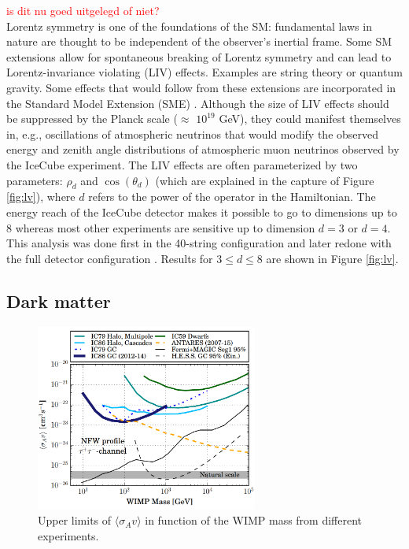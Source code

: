 \textcolor{red}{is dit  nu goed uitgelegd of niet?\\}
Lorentz symmetry is one of the foundations of the SM: fundamental laws in nature are thought to be independent of the observer's inertial frame. Some SM extensions allow for spontaneous breaking of Lorentz symmetry and can lead to Lorentz-invariance violating (LIV) effects. Examples are string theory or quantum gravity. Some effects that would follow from these extensions are incorporated in the Standard Model Extension (SME) \cite{Colladay:1998fq}. Although the size of LIV effects should be suppressed by the Planck scale ($\approx$ $10^{19}$ GeV), they could manifest themselves in, e.g., oscillations of atmospheric neutrinos that would modify the observed energy and zenith angle distributions of atmospheric muon neutrinos observed by the IceCube experiment. The LIV effects are often parameterized by two parameters: $\rho_d$ and $\cos \left(\theta_d\right)$ (which are explained in the capture of Figure \ref{fig:lv}), where $d$ refers to the power of the operator in the Hamiltonian. The energy reach of the IceCube detector makes it possible to go to dimensions up to 8 whereas most other experiments are sensitive up to dimension $d=3$ or $d=4$. This analysis was done first in the 40-string configuration \cite{Abbasi:2010kx} and later redone with the full detector configuration \cite{Aartsen:2017ibm}. Results for $3 \leq d \leq 8$ are shown in Figure \ref{fig:lv}.

\subsection{Dark matter}
\label{subsubsec:DM}

\begin{figure}[ht]
\centering
\includegraphics[width=0.65\textwidth]{chapter5/img/dm.png}
\caption{Upper limits of $\langle \sigma_A v\rangle$ in function of the WIMP mass from different experiments.}
\label{fig:dm}
\end{figure}

